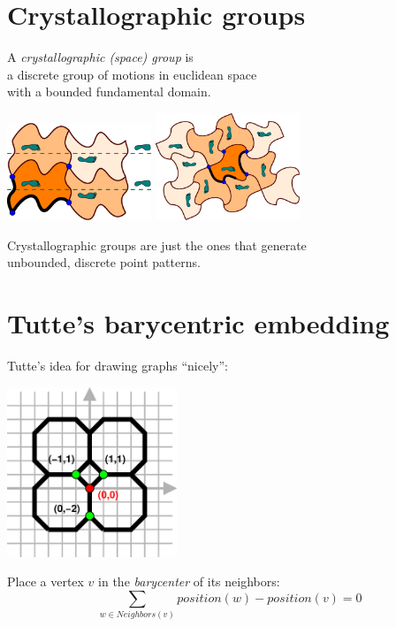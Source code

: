 \documentclass{beamer}
\begin{document}
\section{Crystallographic groups}

\begin{frame}
  \begin{center}
    A {\em crystallographic (space) group\/} is\\
    a discrete group of motions in euclidean space\\
    with a bounded fundamental domain.

    \includegraphics[width=1.7in]{heesch-TGTG}
    \qquad
    \includegraphics[width=1.7in]{heesch-C4C4C4C4C}

    Crystallographic groups are just the ones that generate\\
    unbounded, discrete point patterns.
  \end{center}
\end{frame}


\section{Tutte's barycentric embedding}

\begin{frame}
  \begin{center}
    Tutte's idea for drawing graphs ``nicely'':

    \includegraphics[width=2in]{equilibrium1}

    Place a vertex $v$ in the {\em barycenter} of its neighbors:
    \[
    \sum_{w\in Neighbors(v)} position(w)-position(v) = 0
    \]
  \end{center}
\end{frame}
\end{document}

